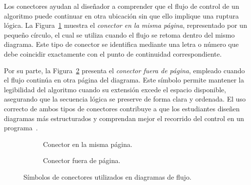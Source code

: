 \documentclass[12pt,twoside]{book}
\begin{document}
						Los conectores ayudan al diseñador a comprender que el flujo de control de un algoritmo puede continuar en otra ubicación sin que ello implique una ruptura lógica. La Figura~\ref{fig:DFConectorInterno} muestra el \emph{conector en la misma página}, representado por un pequeño círculo, el cual se utiliza cuando el flujo se retoma dentro del mismo diagrama. Este tipo de conector se identifica mediante una letra o número que debe coincidir exactamente con el punto de continuidad correspondiente.
						
						Por su parte, la Figura~\ref{fig:DFConectorExterno} presenta el \emph{conector fuera de página}, empleado cuando el flujo continúa en otra página del diagrama. Este símbolo permite mantener la legibilidad del algoritmo cuando su extensión excede el espacio disponible, asegurando que la secuencia lógica se preserve de forma clara y ordenada. El uso correcto de ambos tipos de conectores contribuye a que los estudiantes diseñen diagramas más estructurados y comprendan mejor el recorrido del control en un programa~\cite{Joyanes2007Fundamentos,Kendall2014Systems}.
						
						\begin{figure}[h]
							\centering
							
							\begin{subfigure}[b]{0.45\textwidth}
								\centering
								\label{fig:DFConectorInterno}
								\caption{Conector en la misma página.}
							\end{subfigure}
							\hfill
							\begin{subfigure}[b]{0.45\textwidth}
								\centering
								\caption{Conector fuera de página.}
								\label{fig:DFConectorExterno}
							\end{subfigure}
							\caption{Símbolos de conectores utilizados en diagramas de flujo.}
							\label{fig:DFConectores}
						\end{figure}
				
\end{document}
